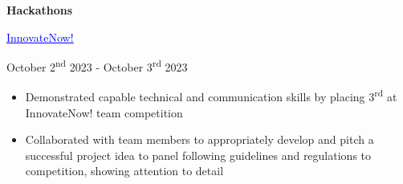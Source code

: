 \documentclass[a4paper,11pt]{article}
\begin{document}
 \begin{minipage}{.65\linewidth}
   \textbf{Hackathons} 
\end{minipage}
 \begin{minipage}{.65\linewidth}
    \href{https://github.com/JeremyFriesenGitHub/InnovateNow}{\textcolor{blue}{\uline{InnovateNow!}}}
\end{minipage}
\begin{minipage}{.34\linewidth}
    \flushright
    October 2\textsuperscript{nd} 2023 - October 3\textsuperscript{rd} 2023
\end{minipage}
\begin{minipage}{\linewidth}
\vspace{10pt}
\begin{itemize}
    \item Demonstrated capable technical and communication skills by placing 3\textsuperscript{rd} at InnovateNow! team competition
    \item Collaborated with team members to appropriately develop and pitch a successful project idea to panel following guidelines and regulations to competition, showing attention to detail
\end{itemize}
\vspace{1pt}
\end{minipage}
\end{document}
